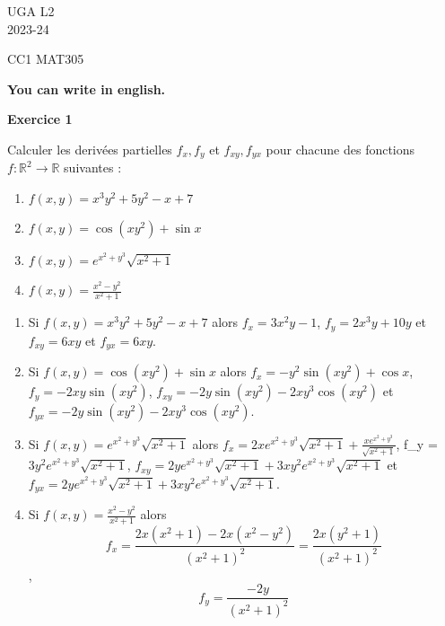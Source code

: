 \documentclass[a4paper,12pt]{article}
\begin{document}
	\noindent UGA \hfill L2\\
	\hfill 2023-24 \\
	\bigskip

	\begin{center}
		\textsc{CC1 MAT305}


{\bf You can write in english.}
		

	\end{center}
	\bigskip
	
\hrulefill
	
\vspace{1cm}

 

\begin{center}
{\large{\bf Exercice 1}}
\end{center}


Calculer les derivées partielles $f_x,f_y$ et $f_{xy}, f_{yx}$ pour
chacune des fonctions\\ 
$f:\mathbb{R}^2 \rightarrow \mathbb{R}$  suivantes :

 
 \begin{enumerate}
 
\item  $f(x,y) = x^3y^2+ 5y^2-x+7$

\item $ f(x,y) = \cos(xy^2)+\sin x$

\item $ f(x,y) = e^{x^2 + y^3}\sqrt{x^2+1}$

\item $f(x,y) = \frac{x^2 - y^2}{x^2 + 1}$

 \end{enumerate}

 \begin{enumerate}
	 \item	
Si $f(x,y) = x^3y^2+ 5y^2-x+7$ alors $f_x = 3x^2y - 1$,
$f_y = 2x^3y + 10y$ et $f_{xy} = 6xy$ et $f_{yx} = 6xy$.

\item Si $f(x,y) = \cos(xy^2)+\sin x$ alors $f_x = -y^2\sin(xy^2) +
	\cos x$, $f_y = -2xy\sin(xy^2)$, $f_{xy} = -2y\sin(xy^2) -
	2xy^3\cos(xy^2)$ et $f_{yx} = -2y\sin(xy^2) -
	2xy^3\cos(xy^2)$.
\item Si $f(x,y) = e^{x^2 + y^3}\sqrt{x^2+1}$ alors $f_x = 2xe^{x^2 +
	y^3}\sqrt{x^2+1} + \frac{xe^{x^2 + y^3}}{\sqrt{x^2+1}}$,
	f_y = $3y^2e^{x^2 + y^3}\sqrt{x^2+1}$, $f_{xy} = 2ye^{x^2
	+	y^3}\sqrt{x^2+1} + 3xy^2e^{x^2 + y^3}\sqrt{x^2+1}$
	et $f_{yx} = 2ye^{x^2 + y^3}\sqrt{x^2+1} + 3xy^2e^{x^2 +
	y^3}\sqrt{x^2+1}$.

\item Si $f(x,y) = \frac{x^2 - y^2}{x^2 + 1}$ alors 
	$$f_x = \frac{2x(x^2 + 1) - 2x(x^2 - y^2)}{(x^2 + 1)^2}
= \frac{2 x (y^2 + 1)}{(x^2 + 1)^2}$$, 
	$$f_y = \frac{-2y}{(x^2 + 1)^2}$$

\end{enumerate}
\end{document}
